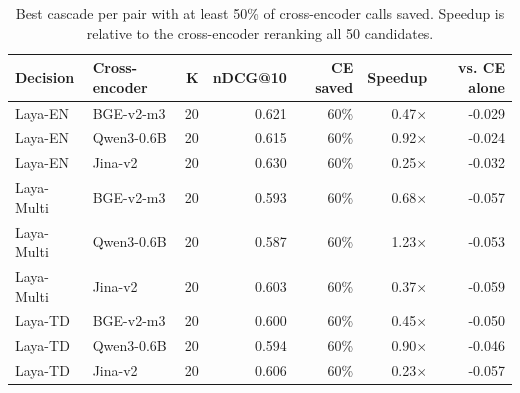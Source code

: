 \begin{table}[t]
\centering
\small
\caption{Best cascade per pair with at least 50\% of cross-encoder calls saved. Speedup is relative to the cross-encoder reranking all 50 candidates.}
\label{tab:cascade}
\begin{tabular}{llrrrrr}
\toprule
Decision & Cross-encoder & K & nDCG@10 & CE saved & Speedup & vs. CE alone \\
\midrule
Laya-EN & BGE-v2-m3 & 20 & 0.621 & 60\% & 0.47$\times$ & -0.029 \\
Laya-EN & Qwen3-0.6B & 20 & 0.615 & 60\% & 0.92$\times$ & -0.024 \\
Laya-EN & Jina-v2 & 20 & 0.630 & 60\% & 0.25$\times$ & -0.032 \\
Laya-Multi & BGE-v2-m3 & 20 & 0.593 & 60\% & 0.68$\times$ & -0.057 \\
Laya-Multi & Qwen3-0.6B & 20 & 0.587 & 60\% & 1.23$\times$ & -0.053 \\
Laya-Multi & Jina-v2 & 20 & 0.603 & 60\% & 0.37$\times$ & -0.059 \\
Laya-TD & BGE-v2-m3 & 20 & 0.600 & 60\% & 0.45$\times$ & -0.050 \\
Laya-TD & Qwen3-0.6B & 20 & 0.594 & 60\% & 0.90$\times$ & -0.046 \\
Laya-TD & Jina-v2 & 20 & 0.606 & 60\% & 0.23$\times$ & -0.057 \\
\bottomrule
\end{tabular}
\end{table}
